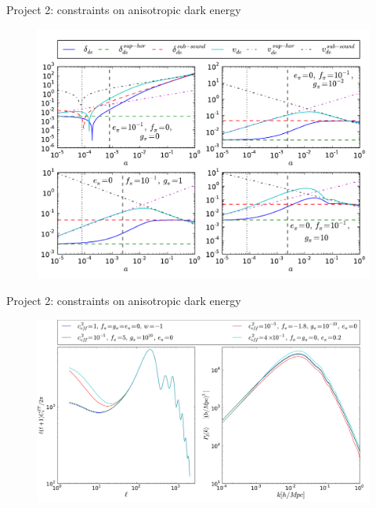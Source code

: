 \documentclass{beamer}
\begin{document}
\begin{frame}{Project 2: constraints on anisotropic dark energy}
\begin{figure}[hbtp]
\centering
\includegraphics[width=\textwidth]{../figures/chapter-ade/comparison.pdf}
\end{figure}

\end{frame}

\begin{frame}{Project 2: constraints on anisotropic dark energy}
\begin{figure}[hbtp]
\centering
\includegraphics[width=\textwidth]{../figures/chapter-ade/PkCls_2.pdf}
\end{figure}
\end{frame}
\end{document}
